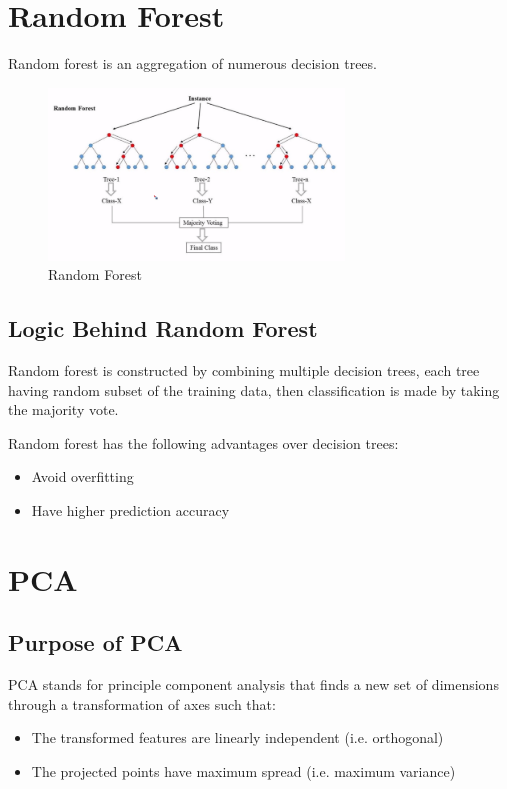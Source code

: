 \documentclass[12pt]{article}
\begin{document}
\section{Random Forest}
Random forest is an aggregation of numerous decision trees.

\begin{figure}[htbp]
\begin{center}
\includegraphics[width = 0.7\textwidth]{Images/Random Forest.png}
\caption{Random Forest}
\label{default}
\end{center}
\end{figure}


\subsection{Logic Behind Random Forest}
Random forest is constructed by combining multiple decision trees, each tree having random subset of the training data, then classification is made by taking the majority vote.

Random forest has the following advantages over decision trees:
\begin{itemize}
	\item Avoid overfitting
	\item Have higher prediction accuracy
\end{itemize}
\newpage

\section{PCA}
\subsection{Purpose of PCA}
PCA stands for principle component analysis that finds a new set of dimensions through a transformation of axes such that:
\begin{itemize}
	\item The transformed features are linearly independent (i.e. orthogonal)
	\item The projected points have maximum spread (i.e. maximum variance)
\end{itemize}
\end{document}
